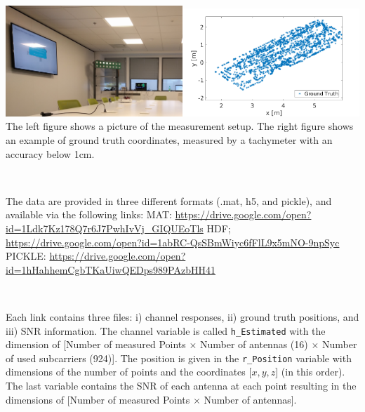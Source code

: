 \documentclass[letter]{moderncv} %
\begin{document}
~


\includegraphics[width=0.5\textwidth]{ParisEnvironment}\includegraphics[width=0.5\textwidth]{IndoorDataset}
The left figure shows a picture of the measurement setup. The
right figure shows  an example of  ground truth coordinates, measured by a tachymeter with an accuracy below 1cm.
\vspace{4ex}

 
~

The data are provided in three different formats (.mat, h5, and pickle), and    available via the following links: \newline
  MAT:    \url{https://drive.google.com/open?id=1Ldk7Kz178Q7r6J7PwhIvVj_GIQUEoTls} \newline
  HDF;    \url{https://drive.google.com/open?id=1abRC-QsSBmWiyc6fFlL9x5mNO-9npSyc} \newline
  PICKLE: \url{https://drive.google.com/open?id=1hHahhemCgbTKaUiwQEDps989PAzbHH41} \newline

~

Each link contains three files:    i) channel responses, ii) ground truth positions, and iii) SNR information.   
The channel variable is called \texttt{h\_Estimated} with the dimension of [Number of measured Points $\times$ Number of antennas (16) $\times$ Number of used subcarriers (924)]. The position is given in the \texttt{r\_Position} variable with dimensions of the number of points  and the coordinates [$x,y,z$] (in this order). The last variable contains the SNR of each antenna at each point resulting in the dimensions 
of [Number of measured Points $\times$ Number of antennas].
\end{document}
